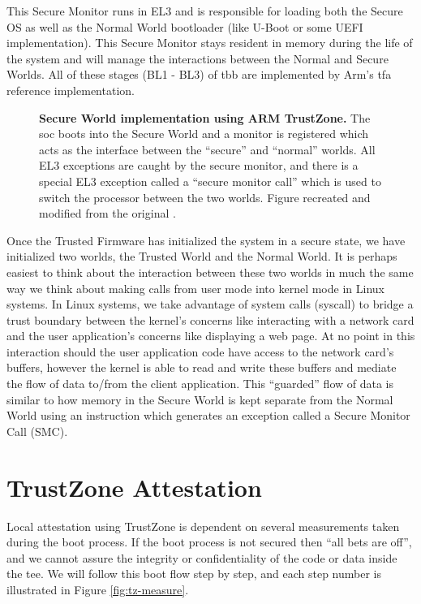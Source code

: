 This Secure Monitor runs in EL3 and is responsible for loading both the Secure OS as well as the Normal World bootloader (like U-Boot or some UEFI implementation). This Secure Monitor stays resident in memory during the life of the system and will manage the interactions between the Normal and Secure Worlds. All of these stages (BL1 - BL3) of \gls{tbb} are implemented by Arm's \gls{tfa} reference implementation.

\begin{figure}[ht]
\makebox[\textwidth][c]{
}\caption[Arm TrustZone Example of Normal and Secure World]{\textbf{Secure World implementation using ARM TrustZone.}
The \gls{soc} boots into the Secure World and a monitor is registered which acts as the interface between the ``secure'' and ``normal'' worlds. All EL3 exceptions are caught by the secure monitor, and there is a special EL3 exception called a ``secure monitor call'' which is used to switch the processor between the two worlds. Figure recreated and modified from the original \cite{TeschkeSGX}.
\label{fig:tz-overview}}
\end{figure}

Once the Trusted Firmware has initialized the system in a secure state, we have initialized two worlds, the Trusted World and the Normal World. It is perhaps easiest to think about the interaction between these two worlds in much the same way we think about making calls from user mode into kernel mode in Linux systems. In Linux systems, we take advantage of system calls (syscall) to bridge a trust boundary between the kernel's concerns like interacting with a network card and the user application's concerns like displaying a web page. At no point in this interaction should the user application code have access to the network card's buffers, however the kernel is able to read and write these buffers and mediate the flow of data to/from the client application. This ``guarded'' flow of data is similar to how memory in the Secure World is kept separate from the Normal World using an instruction which generates an exception called a Secure Monitor Call (SMC).

\section{TrustZone Attestation}

Local \gls{attestation} using TrustZone is dependent on several \glspl{measurement} taken during the boot process. If the boot process is not secured then ``all bets are off'', and we cannot assure the integrity or confidentiality of the code or data inside the \gls{tee}. We will follow this boot flow step by step, and each step number is illustrated in Figure \ref{fig:tz-measure}.

